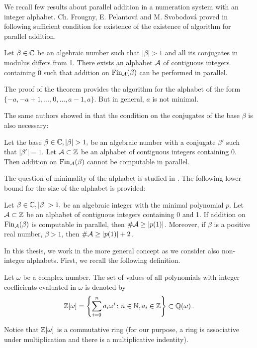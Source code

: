 We recall few results about parallel addition in a numeration system with an integer alphabet. Ch. Frougny, E. Pelantov\'a and M. Svobodov\'a proved in \cite{parAddNS} following sufficient condition for existence of the existence of algorithm for parallel addition.
  \begin{theo}
  \label{thm:suffConjugates}
  Let $\beta\in\mathbb{C}$ be an algebraic number such that $|\beta|>1$ and all its conjugates in modulus differs from 1. There exists an alphabet $\mathcal{A}$ of contiguous integers containing 0 such that addition on $\text{Fin}_{\mathcal{A}}(\beta)$ can be performed in parallel.
  \end{theo}
  The proof of the theorem provides the algorithm for the alphabet of the form $\{-a,-a+1, \dots,0,\dots,a-1,a\}$. But in general, $a$ is not minimal.
    
The same authors showed in \cite{kBlock} that the condition on the conjugates of the base $\beta$ is also necessary:
  \begin{theo}
  Let the base $\beta\in\CC, |\beta|>1,$ be an algebraic number with a conjugate $\beta'$ such that $|\beta'|=1$. Let $\mathcal{A}\subset\mathbb{Z}$ be an alphabet of contiguous integers containing 0. Then addition on $\text{Fin}_{\mathcal{A}}(\beta)$ cannot be computable in parallel.
  \end{theo}
  
The question of minimality of the alphabet is studied in \cite{minAlph}. The following lower bound for the size of the alphabet is provided:
  \begin{theo}
  \label{thm:lowerBoundAlphabet}
  Let $\beta\in\CC, |\beta|>1,$  be an algebraic integer with the minimal polynomial $p$. Let $\mathcal{A}\subset\mathbb{Z}$ be an alphabet of contiguous integers containing 0 and 1. If addition on $\text{Fin}_{\mathcal{A}}(\beta)$ is computable in parallel, then $\#\mathcal{A} \geq |p(1)|$. Moreover, if $\beta$ is a positive real number, $\beta>1$, then $\#\mathcal{A} \geq  |p(1)|+2$.
  \end{theo}
  

In this thesis, we work in the more general concept as we consider also non-integer alphabets. First, we recall the following definition.
\begin{defn}
Let $\omega$ be a complex number. The set of values of all polynomials with integer coefficients evaluated in $\omega$ is denoted by
$$
    \mathbb{Z}[\omega] =\left\{\sum_{i=0}^n a_i \omega^i\colon n\in\mathbb{N}, a_i\in\mathbb{Z} \right\} \subset \mathbb{Q}(\omega)\,.
$$
\end{defn}
 Notice that $\mathbb{Z}[\omega]$ is a commutative ring (for our purpose, a ring is associative under multiplication and there is a multiplicative indentity).     
    
